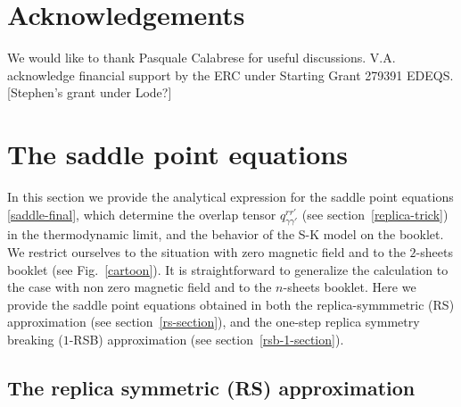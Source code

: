 \documentclass[twocolumn,superscriptaddress,prb,10pt]{revtex4-1}
\begin{document}
\section{Acknowledgements}
We would like to thank Pasquale Calabrese for useful discussions. V.A.  acknowledge 
financial support by the ERC under Starting Grant 279391 EDEQS. 
[Stephen's grant under Lode?]




\appendix

\section{The saddle point equations} 
\label{saddle-equations}

In this section we provide the analytical expression for the saddle point equations 
\eqref{saddle-final}, which determine the overlap tensor $q_{\gamma\gamma'}^{rr'}$ 
(see section~\ref{replica-trick}) in the thermodynamic limit, and the behavior of the 
S-K model on the booklet. We restrict ourselves to the situation with zero magnetic 
field and to the $2$-sheets booklet (see Fig.~\ref{cartoon}). It is straightforward 
to generalize the calculation to the case with non zero magnetic field and to the 
$n$-sheets booklet. Here we provide the saddle point equations obtained in both the 
replica-symmmetric (RS) approximation (see section~\ref{rs-section}), and the 
one-step replica symmetry breaking ($1$-RSB) approximation (see 
section~\ref{rsb-1-section}). 

\subsection{The replica symmetric (RS) approximation}
\end{document}
